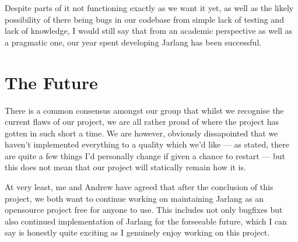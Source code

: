 \documentclass[twoside,12pt,titlepage,a4paper]{article}
\newcommand\blankpage{%
    \null
    \thispagestyle{empty}%
    \addtocounter{page}{-1}%
    \newpage}
\begin{document}
	Despite parts of it not functioning exactly as we want it yet, as well as the likely possibility of there being bugs in our codebase
	from simple lack of testing and lack of knowledge, I would still say that from an academic perspective as well as a pragmatic 
	one, our year spent developing Jarlang has been successful.

\section{The Future}
\label{The Future}
	There is a common consensus amongst our group that whilst we recognise the current flaws of our project, we are all rather proud
	of where the project has gotten in such short a time. We are however, obviously dissapointed that we haven't implemented everything
	to a quality which we'd like --- as stated, there are quite a few things I'd personally change if given a chance to restart --- but
	this does not mean that our project will statically remain how it is.

	At very least, me and Andrew have agreed that after the conclusion of this project, we both want to continue working on maintaining Jarlang
	as an opensource project free for anyone to use. This includes not only bugfixes but also continued implementation of Jarlang for
	the forseeable future, which I can say is honestly quite exciting as I genuinely enjoy working on this project.


%

\blankpage
\end{document}
